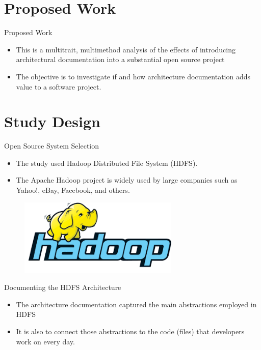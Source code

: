 \documentclass[t,14pt,mathserif]{beamer}
\begin{document}
\section{Proposed Work}


\begin{frame}{Proposed Work}
	\begin{itemize}
	\item This is a multitrait, multimethod analysis of the effects of introducing architectural documentation into a substantial open source project
	\item The objective is to investigate \alert{if} and \alert{how} architecture documentation adds \alert{value} to a software project.
	\end{itemize}	
\end{frame}

\section{Study Design}

\begin{frame}{Open Source System Selection}
	
	\begin{itemize}
		\item The study used Hadoop Distributed File System (HDFS)\cite{shvachko2010hadoop}.
		\item The Apache Hadoop project is widely used by large companies such as Yahoo!, eBay, Facebook, and others.
	\end{itemize}
	
	\begin{figure}[!t]
		\centering
		\includegraphics[width=3.0in]{../img/hadoop-logo}
		\label{fig:hadoop-logo}
	\end{figure}
\end{frame}


\begin{frame}{Documenting the HDFS Architecture}
	
	\begin{itemize}
		\item The architecture documentation captured the main abstractions employed in HDFS
		\item It is also to connect those abstractions to the code (files) that developers work on every day.	
	\end{itemize}

\end{frame}
\end{document}
